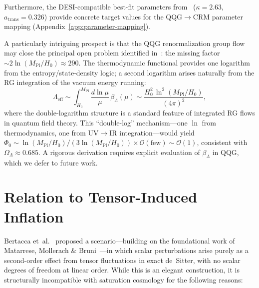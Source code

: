 \documentclass[aps,prd,twocolumn,superscriptaddress,nofootinbib]{revtex4-2}
\begin{document}
Furthermore, the DESI-compatible best-fit parameters from~\cite{GeigerDE2026} ($\kappa = 2.63$, $a_\mathrm{trans} = 0.326$) provide concrete target values for the QQG$\to$CRM parameter mapping (Appendix~\ref{app:parameter-mapping}).

A particularly intriguing prospect is that the QQG renormalization group flow may close the principal open problem identified in~\cite{GeigerDE2026}: the missing factor $\sim 2\ln(M_\mathrm{Pl}/H_0) \approx 290$. The thermodynamic functional provides one logarithm from the entropy/state-density logic; a second logarithm arises naturally from the RG integration of the vacuum energy running:
\begin{equation}
\Lambda_\mathrm{eff} \sim \int_{H_0}^{M_\mathrm{Pl}} \frac{d\ln\mu}{\mu}\,\beta_\Lambda(\mu) \sim \frac{H_0^2\,\ln^2(M_\mathrm{Pl}/H_0)}{(4\pi)^2},
\end{equation}
where the double-logarithm structure is a standard feature of integrated RG flows in quantum field theory. This ``double-log'' mechanism---one $\ln$ from thermodynamics, one from UV$\to$IR integration---would yield $\Phi_0 \sim \ln(M_\mathrm{Pl}/H_0)/(3\ln(M_\mathrm{Pl}/H_0)) \times \mathcal{O}(\text{few}) \sim \mathcal{O}(1)$, consistent with $\Omega_\Lambda \approx 0.685$. A rigorous derivation requires explicit evaluation of $\beta_\Lambda$ in QQG, which we defer to future work.


\section{Relation to Tensor-Induced Inflation}
\label{sec:tensor-inflation}

Bertacca et~al.~\cite{Bertacca2025} proposed a scenario---building on the foundational work of Matarrese, Mollerach \& Bruni~\cite{Matarrese1998}---in which scalar perturbations arise purely as a second-order effect from tensor fluctuations in exact de~Sitter, with no scalar degrees of freedom at linear order. While this is an elegant construction, it is structurally incompatible with saturation cosmology for the following reasons:
\end{document}
